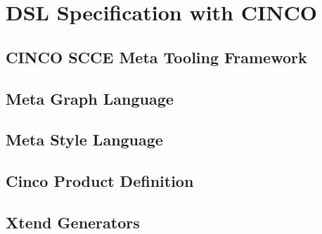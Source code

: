 
\chapter{DSL Specification with CINCO}\label{ch:DSL}
\section{CINCO SCCE Meta Tooling Framework}
\section{Meta Graph Language}
\section{Meta Style Language}
\section{Cinco Product Definition}
\section{Xtend Generators}
